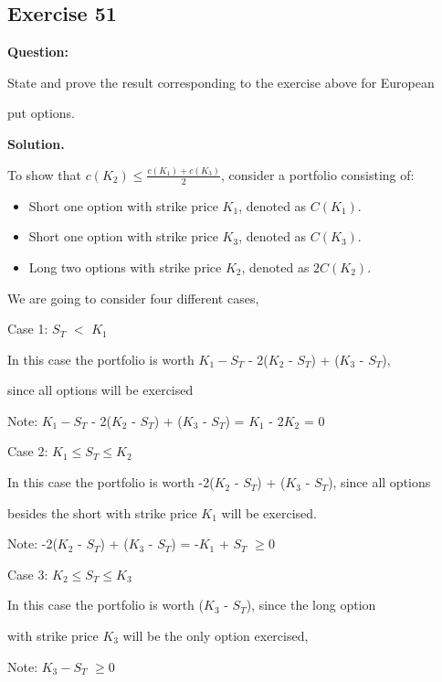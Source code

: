 \documentclass{article}
\begin{document}
\subsection*{Exercise 51}
\textbf{Question:} 

State and prove the result corresponding to the exercise above for European 

put options.

\textbf{Solution.}

To show that $c(K_2)\leq \frac{c(K_1)+c(K_3)}{2}$, consider a portfolio consisting of:
\begin{itemize}
    \item Short one option with strike price $K_1$, denoted as $C(K_1)$.
    \item Short one option with strike price $K_3$, denoted as $C(K_3)$.
    \item Long two options with strike price $K_2$, denoted as $2C(K_2)$.
\end{itemize}

We are going to consider four different cases,

\vspace{\baselineskip}

Case 1: $S_T$ $<$ $K_1$

In this case the portfolio is worth $K_1 - S_T$ - 2($K_2$ - $S_T$) + ($K_3$ - $S_T$),

since all options will be exercised

Note: $K_1 - S_T$ - 2($K_2$ - $S_T$) + ($K_3$ - $S_T$) = $K_1$ - $2K_2$ = 0

\vspace{\baselineskip}

Case 2: $K_1 \leq S_T \leq K_2$

In this case the portfolio is worth -2($K_2$ - $S_T$) + ($K_3$ - $S_T$), since all options 

besides the short with strike price $K_1$ will be exercised. 

Note: -2($K_2$ - $S_T$) + ($K_3$ - $S_T$) = -$K_1$ + $S_T$  $\geq 0$

\vspace{\baselineskip}

Case 3: $K_2 \leq S_T \leq K_3$

In this case the portfolio is worth  ($K_3$ - $S_T$), since the long option 

with strike price $K_3$ will be the only option exercised,

Note: $K_3 - S_T$ $\geq 0$
\end{document}
